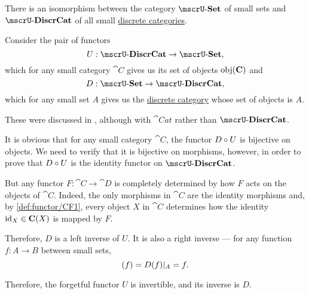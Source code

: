 \begin{example}\label{ex:set_discr_cat_isomorphism}
  There is an isomorphism between the category \( \ucat{Set} \) of small sets and \( \ucat{DiscrCat} \) of all small \hyperref[def:discrete_category]{discrete categories}.

  Consider the pair of functors
  \begin{equation*}
    U: \ucat{DiscrCat} \to \ucat{Set},
  \end{equation*}
  which for any small category \( \cat{C} \) gives us its set of objects \( \operatorname{obj}(\operatorname{\mathbf{C}}) \) and
  \begin{equation*}
    D: \ucat{Set} \to \ucat{DiscrCat},
  \end{equation*}
  which for any small set \( A \) gives us the \hyperref[def:discrete_category]{discrete category} whose set of objects is \( A \).

  These were discussed in , although with \( \cat{Cat} \) rather than \( \ucat{DiscrCat} \).

  It is obvious that for any small category \( \cat{C} \), the functor \( D \bincirc U \) is bijective on objects. We need to verify that it is bijective on morphisms, however, in order to prove that \( D \bincirc U \) is the identity functor on \( \ucat{DiscrCat} \).

  But any functor \( F: \cat{C} \to \cat{D} \) is completely determined by how \( F \) acts on the objects of \( \cat{C} \). Indeed, the only morphisms in \( \cat{C} \) are the identity morphisms and, by \ref{def:functor/CF1}, every object \( X \) in \( \cat{C} \) determines how the identity \( \operatorname{id}_X \in \operatorname{\mathbf{C}}(X) \) is mapped by \( F \).

  Therefore, \( D \) is a left inverse of \( U \). It is also a right inverse --- for any function \( f: A \to B \) between small sets,
  \begin{equation*}
    [U \bincirc D](f) = D(f)\restr_{A} = f.
  \end{equation*}

  Therefore, the forgetful functor \( U \) is invertible, and its inverse is \( D \).
\end{example}

